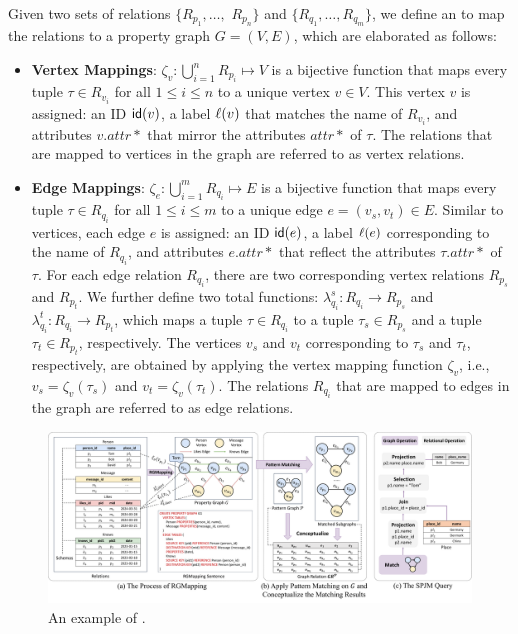 \begin{definition}[\rgmapping]
\label{def:rgmapping}
Given two sets of relations $\{R_{p_1}, \ldots,$ $R_{p_n}\}$ and $\{R_{q_1}, \ldots, R_{q_m}\}$,
we define an \rgmapping to map the relations to a property graph $G = (V, E)$, %
which are elaborated as follows:

\begin{itemize}
\item \textbf{Vertex Mappings}: $\zeta_v: \bigcup_{i=1}^{n} R_{p_i} \mapsto V$ is a bijective function that maps every tuple $\tau \in R_{v_i}$ for all $1 \leq i \leq n$ to a unique vertex $v \in V$. This vertex $v$ is assigned: an ID ${\mathsf{id}}(v)$, a label $\mathcal{\ell}(v)$ that matches the name of $R_{v_i}$, and attributes $v.attr*$ that mirror the attributes $attr*$ of $\tau$.
The relations that are mapped to vertices in the graph are referred to as vertex relations.

\item \textbf{Edge Mappings}: $\zeta_e: \bigcup_{i=1}^{m} R_{q_i} \mapsto E$ is a bijective function that maps every tuple $\tau \in R_{q_i}$ for all $1 \leq i \leq m$ to a unique edge $e = (v_s, v_t) \in E$. Similar to vertices, each edge $e$ is assigned: an ID ${\mathsf{id}}(e)$,
a label $\mathcal{\ell}(e)$ corresponding to the name of $R_{q_i}$, and attributes $e.attr*$ that reflect the attributes $\tau.attr*$ of $\tau$.
For each edge relation $R_{q_i}$, there are two corresponding vertex relations $R_{p_s}$ and $R_{p_t}$.
We further define two total functions: $\lambda_{q_i}^s: R_{q_i} \to R_{p_s}$ and $\lambda_{q_i}^t: R_{q_i} \to R_{p_t}$, which maps a tuple $\tau \in R_{q_i}$ to a tuple $\tau_s \in R_{p_s}$ and a tuple $\tau_t \in R_{p_t}$, respectively.
The vertices $v_s$ and $v_t$ corresponding to $\tau_s$ and $\tau_t$, respectively, are obtained by applying the vertex mapping function $\zeta_v$, i.e., $v_s = \zeta_v(\tau_s)$ and $v_t = \zeta_v(\tau_t)$.
The relations $R_{q_i}$ that are mapped to edges in the graph are referred to as edge relations.
\end{itemize}
\end{definition}

\begin{figure}
    \centering
    \includegraphics[width=\linewidth]{./figures/rgmapping.pdf}
    \caption{An example of \rgmapping.}
    \label{fig:intro-rgmapping-example}
\end{figure}

